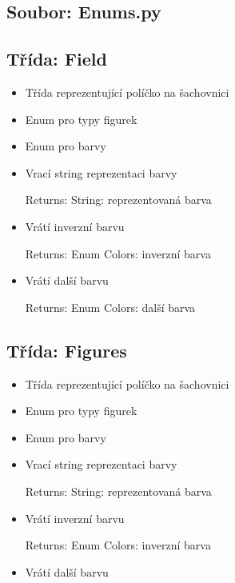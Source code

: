\documentclass{article}
\begin{document}
\subsection*{Soubor: Enums.py}
\begin{itemize}
 \subsection*{Třída: Field}
\begin{itemize}
\item{Třída reprezentující políčko na šachovnici
  }
\item{Enum pro typy figurek
  }
\item{Enum pro barvy
  }
\item{Vrací string reprezentaci barvy

Returns:
    String: reprezentovaná barva}
\item{Vrátí inverzní barvu

Returns:
    Enum Colors: inverzní barva}
\item{Vrátí další barvu

Returns:
    Enum Colors: další barva}
\end{itemize}
 \subsection*{Třída: Figures}
\begin{itemize}
\item{Třída reprezentující políčko na šachovnici
  }
\item{Enum pro typy figurek
  }
\item{Enum pro barvy
  }
\item{Vrací string reprezentaci barvy

Returns:
    String: reprezentovaná barva}
\item{Vrátí inverzní barvu

Returns:
    Enum Colors: inverzní barva}
\item{Vrátí další barvu

}
\end{itemize}
\end{itemize}
\end{document}
